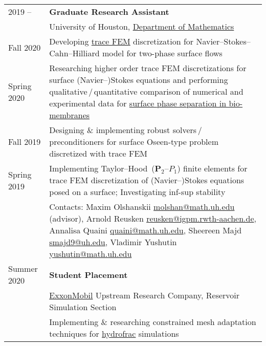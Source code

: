 \documentclass[a4paper,12pt]{article}
\begin{document}
	\begin{longtable}{ l >{\raggedright\arraybackslash}p{15cm} }
		2019 --
			& \textbf{Graduate Research Assistant}\vspace{1mm}\\
			& University of Houston, \href{http://www.uh.edu/nsm/math/}{Department of Mathematics}\vspace{1mm}\\
		Fall 2020
			& Developing \href{https://www.math.uh.edu/~molshan/tracefinite.html}{trace FEM} discretization for Navier--Stokes--Cahn--Hilliard model for two-phase surface flows\vspace{1mm}\\	
		Spring 2020
			& Researching higher order trace FEM discretizations for surface (Navier--)Stokes equations and performing qualitative\,/\,quantitative comparison of numerical and experimental data for \href{https://www.math.uh.edu/~molshan/material.html}{surface phase separation in bio-membranes}\vspace{1mm}\\
		Fall 2019
			& Designing \& implementing robust solvers\,/\,preconditioners for surface Oseen-type problem discretized with trace FEM\vspace{1mm}\\
		Spring 2019
			& Implementing Taylor--Hood~($\mathbf{P}_2$--$P_1$) finite elements for trace FEM discretization of (Navier--)Stokes equations posed on a surface; Investigating inf-sup stability\vspace{1mm}\\
			& Contacts: Maxim Olshanskii \href{mailto:molshan@math.uh.edu}{molshan@math.uh.edu} (advisor), Arnold Reusken \href{mailto:reusken@igpm.rwth-aachen.de}{reusken@igpm.rwth-aachen.de}, Annalisa Quaini \href{mailto:quaini@math.uh.edu}{quaini@math.uh.edu}, Sheereen Majd \href{mailto:smajd9@uh.edu}{smajd9@uh.edu}, Vladimir Yushutin \href{mailto:yushutin@math.uh.edu}{yushutin@math.uh.edu}\vspace{3mm}\\
		Summer 2020
			& \textbf{Student Placement}\vspace{1mm}\\
			& \href{https://corporate.exxonmobil.com/}{ExxonMobil} Upstream Research Company, Reservoir Simulation Section\vspace{1mm}\\
			& Implementing \& researching constrained mesh adaptation techniques for \href{https://en.wikipedia.org/wiki/Hydraulic_fracturing}{hydrofrac} simulations\vspace{1mm}\\

\end{longtable}
\end{document}
